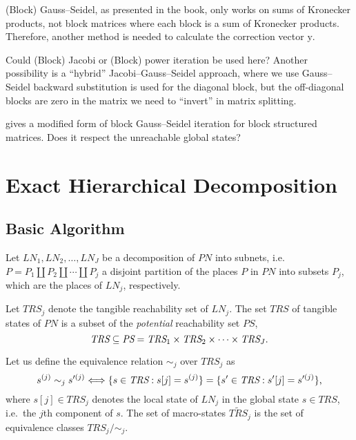 \documentclass[a4paper,11pt,twoside,openright]{memoir}
\newcommand*{\PN}{\textit{PN}}
\newcommand*{\LN}{\textit{LN}}
\renewcommand*{\vec}[1]{\boldsymbol{\mathrm{#1}}}
\newcommand*{\TRS}{\textit{TRS}}
\newcommand*{\PS}{\textit{PS}}
\newcommand*{\macroStates}{}\let\macroStates\widetilde
\newcommand*{\macroTRS}{\macroStates{\TRS}}
\theoremstyle{my}
\begin{document}
(Block) Gauss--Seidel, as presented in the book, only works on sums of
Kronecker products, not block matrices where each block is a sum of
Kronecker products. Therefore, another method is needed to calculate
the correction vector $\vec{y}$.

Could (Block) Jacobi or (Block) power iteration \citep[Section
3.2]{dayar2012analyzing} be used here? Another possibility is a
``hybrid'' Jacobi--Gauss--Seidel approach, where we use Gauss--Seidel
backward substitution is used for the diagonal block, but the
off-diagonal blocks are zero in the matrix we need to ``invert'' in
matrix splitting.

\citet[Equation~(16)]{DBLP:journals/questa/Buchholz94} gives a
modified form of block Gauss--Seidel iteration for block structured
matrices. Does it respect the unreachable global states?

\section{Exact Hierarchical Decomposition}

\subsection{Basic Algorithm}

Let $\LN_1, \LN_2, \ldots, \LN_J$ be a decomposition of $\PN$ into
subnets, i.e.~$P = P_1 \coprod P_2 \coprod \cdots \coprod P_j$ a
disjoint partition of the places $P$ in $\PN$ into subsets $P_j$,
which are the places of $\LN_j$, respectively.

Let $\TRS_j$ denote the tangible reachability set of $\LN_j$. The set
$\TRS$ of tangible states of $\PN$ is a subset of the \emph{potential}
reachability set $\PS$,
\begin{equation}
  \TRS \subseteq \PS = \TRS_1 \times \TRS_2 \times \cdots \times
  \TRS_J\text.
\end{equation}

Let us define the equivalence relation $\sim_j$ over $\TRS_j$ as
\begin{equation}\label{eq:kronecker:state-equivalence}
  s^{(j)} \sim_j s'^{(j)} \Longleftrightarrow \{ s \in \TRS : s[j] =
  s^{(j)} \} = \{ s' \in \TRS : s'[j] = s'^{(j)} \} \text,
\end{equation}
where $s[j] \in \TRS_j$ denotes the local state of $\LN_j$ in the
global state $s \in \TRS$, i.e.~the $j$th component of $s$. The set of
macro-states $\macroTRS_j$ is the set of equivalence classes $\TRS_j /
{\sim_j}$.
\end{document}
